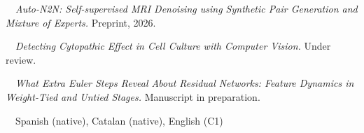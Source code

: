 \par\nopagebreak
\vspace{\acvSectionContentTopSkip}
\vspace{-2.5mm}
{\bodyfont\fontsize{7.6pt}{0.95em}\selectfont\raggedright
\noindent\textbullet~~\textit{Auto-N2N: Self-supervised MRI Denoising using Synthetic Pair Generation and Mixture of Experts.}
Preprint, 2026.\par
\vspace{0.15mm}
\noindent\textbullet~~\textit{Detecting Cytopathic Effect in Cell Culture with Computer Vision.}
Under review.\par
\vspace{0.15mm}
\noindent\textbullet~~\textit{What Extra Euler Steps Reveal About Residual Networks: Feature Dynamics in Weight-Tied and Untied Stages.}
Manuscript in preparation.\par
\vspace{0.6mm}
~~Spanish (native), Catalan (native), English (C1)\par
}
